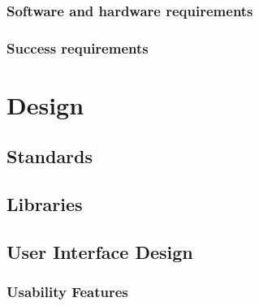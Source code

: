 \documentclass[11pt,a4paper]{report}
\begin{document}
\pagebreak

\subsection{Software and hardware requirements}


\pagebreak

\subsection{Success requirements}



\pagebreak

\chapter{Design}

\section{Standards}


\section{Libraries}


\section{User Interface Design}

\begin{comment}
design: for each page/screen:

picture of page


brief desc of what the page will do

for each one show the stakeholder requirements or success requirements that will be met when this page/feature is implmented;


then break down each component of the design page.
sentance or two on what it does and why (justify it being there)

\end{comment}

\subsection{Usability Features}

\end{document}
